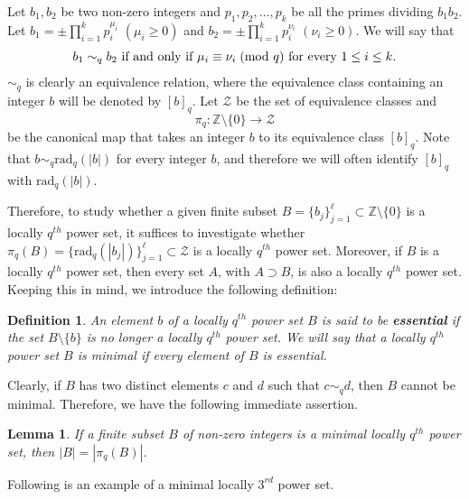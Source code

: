 \documentclass[12pt]{amsart}
\newtheorem{lemma}[theorem]{Lemma}
\newtheorem{definition}{Definition}
\begin{document}
Let $b_{1}, b_{2}$ be two non-zero integers and $p_{1}, p_{2}, \ldots, p_{k}$ be all the primes dividing $b_{1}b_{2}$. Let $b_{1} = \pm \prod_{i=1}^{k} p_{i}^{\mu_{i}}$ $(\mu_{i} \geq 0)$ and $b_{2} = \pm \prod_{i=1}^{k} p_{i}^{\nu_{i}}$ $(\nu_{i} \geq 0)$. We will say that 
\begin{equation*}
    b_{1} \sim_{q} b_{2} \text{ if and only if } \mu_{i} \equiv \nu_{i} \hspace{1mm} (\text{mod } q) \text{ for every } 1 \leq i \leq k.
\end{equation*}
$\sim_{q}$ is clearly an equivalence relation, where the equivalence class containing an integer $b$ will be denoted by $[b]_{q}$. Let $\mathcal{Z}$ be the set of equivalence classes and \[\pi_{q}: \mathbb{Z}\setminus\{0\} \rightarrow \mathcal{Z}\] be the canonical map that takes an integer $b$ to its equivalence class $[b]_{q}$. %
Note that $b \sim_{q} \text{rad}_{q}(|b|)$ for every integer $b$, and therefore we will often identify $[b]_{q}$ with $\text{rad}_{q}(|b|)$. 

Therefore, to study whether a given finite subset $B = \{b_{j}\}_{j=1}^{\ell} \subset\mathbb{Z}\setminus\{0\}$ is a locally $q^{th}$ power set, it suffices to investigate whether $\pi_{q}(B) = \{\text{rad}_{q}(|b_{j}|)\}_{j=1}^{\ell}\subset\mathcal{Z}$ is a locally $q^{th}$ power set. Moreover, if $B$ is a locally $q^{th}$ power set, then every set $A$, with $A \supset B$, is also a locally $q^{th}$ power set. Keeping this in mind, we introduce the following definition:

\begin{definition}
An element $b$ of a locally $q^{th}$ power set $B$ is said to be \textbf{essential} if the set $B\setminus\{b\}$ is no longer a locally $q^{th}$ power set. We will say that a locally $q^{th}$ power set $B$ is minimal if every element of $B$ is essential. 
\end{definition}

Clearly, if $B$ has two distinct elements $c$ and $d$ such that $c \sim_{q} d$, then $B$ cannot be minimal. Therefore, we have the following immediate assertion.
\begin{lemma} \label{lem:sizeqfree}
If a finite subset $B$ of non-zero integers is a minimal locally $q^{th}$ power set, then $|B| = |\pi_{q}(B)|$. \label{basicminimal}
\end{lemma}


Following is an example of a minimal locally $3^{rd}$ power set. 
\end{document}
